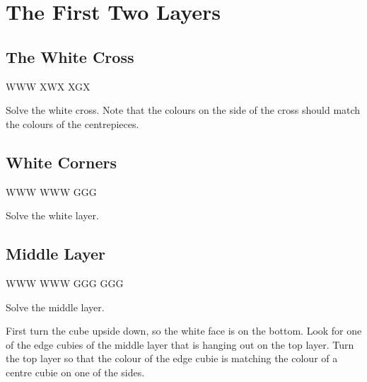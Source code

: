 \documentclass{article}
\begin{document}
    \section{The First Two Layers}

    \subsection{The White Cross}

    \RubikCubeGreyWY
     {W}{W}{W} {X}{W}{X}
     {X}{G}{X}

    \begin{goal}
        Solve the white cross.
        Note that the colours on the side of the cross should match the colours of the centrepieces.
    \end{goal}


    \subsection{White Corners}

    \RubikCubeGreyWY
     {W}{W}{W} {W}{W}{W}
     {G}{G}{G}

    \begin{goal}
        Solve the white layer.
    \end{goal}


    \subsection{Middle Layer}

    \RubikCubeGreyWY
     {W}{W}{W} {W}{W}{W}
     {G}{G}{G}
     {G}{G}{G}

    \begin{goal}
        Solve the middle layer.
    \end{goal}

    First turn the cube upside down, so the white face is on the bottom.
    Look for one of the edge cubies of the middle layer that is hanging out on the top layer.
    Turn the top layer so that the colour of the edge cubie is matching the colour of a centre cubie on one of the sides.

    \RubikCubeSolved
\end{document}

